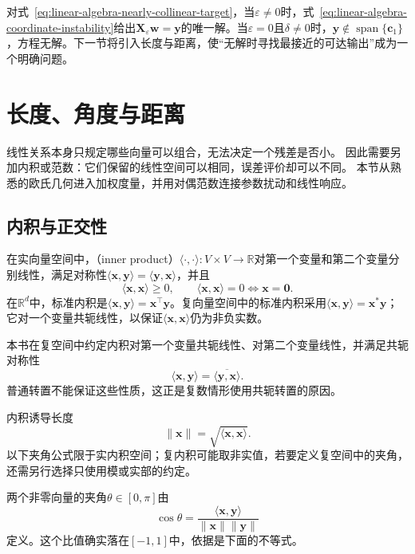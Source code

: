 对式~\eqref{eq:linear-algebra-nearly-collinear-target}，当$\varepsilon\neq0$时，式~\eqref{eq:linear-algebra-coordinate-instability}给出$\bm{X}_{\varepsilon}\bm{w}=\bm{y}$的唯一解。当$\varepsilon=0$且$\delta\neq0$时，$\bm{y}\notin\operatorname{span}\{\bm{c}_1\}$，方程无解。下一节将引入长度与距离，使“无解时寻找最接近的可达输出”成为一个明确问题。

\section{长度、角度与距离}
\label{sec:linear-algebra-length-angle-distance}

线性关系本身只规定哪些向量可以组合，无法决定一个残差是否小。
因此需要另加内积或范数：它们保留的线性空间可以相同，误差评价却可以不同。
本节从熟悉的欧氏几何进入加权度量，并用对偶范数连接参数扰动和线性响应。

\subsection{内积与正交性}

在实向量空间中，（inner product）$\langle\cdot,\cdot\rangle:V\times V\to\mathbb{R}$对第一个变量和第二个变量分别线性，满足对称性$\langle\bm{x},\bm{y}\rangle=\langle\bm{y},\bm{x}\rangle$，并且
\[
  \langle\bm{x},\bm{x}\rangle\geq0,
  \qquad
  \langle\bm{x},\bm{x}\rangle=0
  \Longleftrightarrow
  \bm{x}=\bm{0}.
\]
在$\mathbb{R}^d$中，标准内积是$\langle\bm{x},\bm{y}\rangle=\bm{x}^{\top}\bm{y}$。复向量空间中的标准内积采用$\langle\bm{x},\bm{y}\rangle=\bm{x}^{*}\bm{y}$；它对一个变量共轭线性，以保证$\langle\bm{x},\bm{x}\rangle$仍为非负实数。

本书在复空间中约定内积对第一个变量共轭线性、对第二个变量线性，并满足共轭对称性
\[
  \langle\bm{x},\bm{y}\rangle
  =
  \overline{\langle\bm{y},\bm{x}\rangle}.
\]
普通转置不能保证这些性质，这正是复数情形使用共轭转置的原因。

内积诱导长度
\begin{equation}
  \lVert\bm{x}\rVert
  =
  \sqrt{\langle\bm{x},\bm{x}\rangle}.
  \label{eq:linear-algebra-inner-product-norm}
\end{equation}
以下夹角公式限于实内积空间；复内积可能取非实值，若要定义复空间中的夹角，还需另行选择只使用模或实部的约定。

两个非零向量的夹角$\theta\in[0,\pi]$由
\[
  \cos\theta
  =
  \frac{\langle\bm{x},\bm{y}\rangle}
       {\lVert\bm{x}\rVert\lVert\bm{y}\rVert}
\]
定义。这个比值确实落在$[-1,1]$中，依据是下面的不等式。

